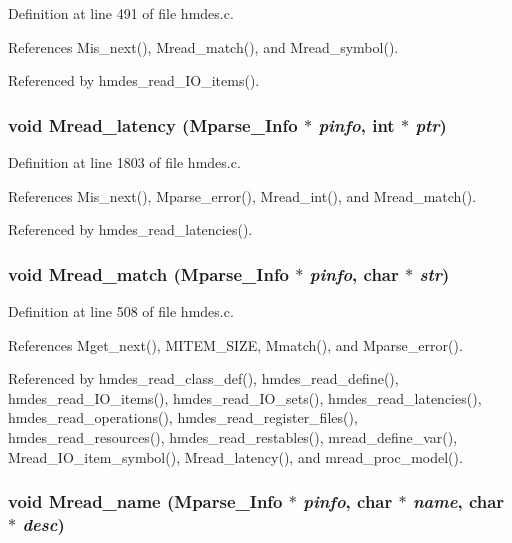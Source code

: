 Definition at line 491 of file hmdes.c.

References Mis\_\-next(), Mread\_\-match(), and Mread\_\-symbol().

Referenced by hmdes\_\-read\_\-IO\_\-items().
\subsubsection{\setlength{\rightskip}{0pt plus 5cm}void Mread\_\-latency (\bf{Mparse\_\-Info} $\ast$ {\em pinfo}, int $\ast$ {\em ptr})}\label{hmdes_8h_22d3dd7a1d22829c6e1ddf7a1b3f51ab}




Definition at line 1803 of file hmdes.c.

References Mis\_\-next(), Mparse\_\-error(), Mread\_\-int(), and Mread\_\-match().

Referenced by hmdes\_\-read\_\-latencies().
\subsubsection{\setlength{\rightskip}{0pt plus 5cm}void Mread\_\-match (\bf{Mparse\_\-Info} $\ast$ {\em pinfo}, char $\ast$ {\em str})}\label{hmdes_8h_6596ec52b951f99374fa8896ea78aa96}




Definition at line 508 of file hmdes.c.

References Mget\_\-next(), MITEM\_\-SIZE, Mmatch(), and Mparse\_\-error().

Referenced by hmdes\_\-read\_\-class\_\-def(), hmdes\_\-read\_\-define(), hmdes\_\-read\_\-IO\_\-items(), hmdes\_\-read\_\-IO\_\-sets(), hmdes\_\-read\_\-latencies(), hmdes\_\-read\_\-operations(), hmdes\_\-read\_\-register\_\-files(), hmdes\_\-read\_\-resources(), hmdes\_\-read\_\-restables(), mread\_\-define\_\-var(), Mread\_\-IO\_\-item\_\-symbol(), Mread\_\-latency(), and mread\_\-proc\_\-model().
\subsubsection{\setlength{\rightskip}{0pt plus 5cm}void Mread\_\-name (\bf{Mparse\_\-Info} $\ast$ {\em pinfo}, char $\ast$ {\em name}, char $\ast$ {\em desc})}\label{hmdes_8h_e2d457c134c37f83e6c72d6c0f9d2281}




